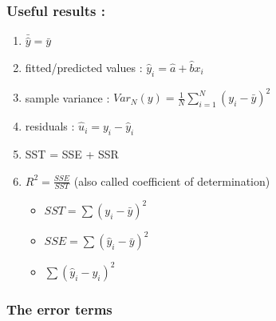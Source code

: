 \documentclass{article}
\begin{document}
\subsubsection{Useful results :} 
    \begin{enumerate}
        \item $\bar{\hat{y}} = \bar{y}$
        \item fitted/predicted values : $\hat{y}_i = \hat{a} + \hat{b}x_i $
        \item sample variance : $Var_N(y) = \frac{1}{N}\sum_{i=1}^N(y_i-\bar{y})^2$
        \item residuals : $\hat{u}_i = y_i-\hat{y}_i$
        \item SST = SSE + SSR 
        \item $R^2 = \frac{SSE}{SST}$ (also called coefficient of determination)
        \begin{itemize}
            \item $SST = \sum(y_i-\bar{y})^2$
            \item $SSE = \sum(\hat{y}_i-\bar{y})^2$
            \item $\sum(\hat{y}_i-y_i)^2$
        \end{itemize}
\end{enumerate}

\subsubsection{The error terms}
\end{document}
